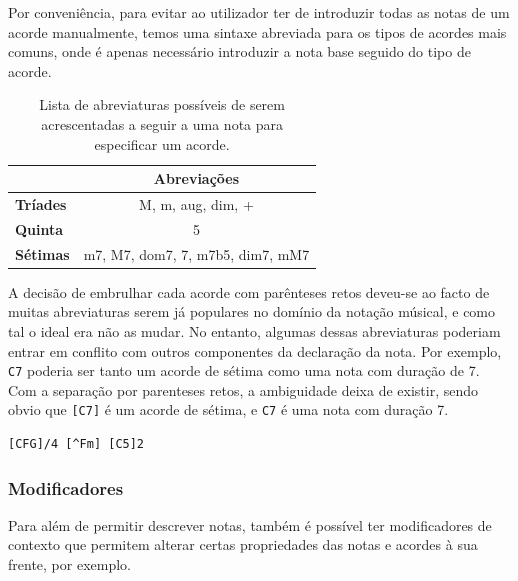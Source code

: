 \documentclass[
  oneside,
  11pt, a4paper,
  footinclude=true,
  headinclude=true,
  cleardoublepage=empty
]{scrbook}
\begin{document}
	Por conveniência, para evitar ao utilizador ter de introduzir todas as notas de um acorde manualmente, temos uma sintaxe abreviada para os tipos de acordes mais comuns, onde é apenas necessário introduzir a nota base seguido do tipo de acorde.
	
\begin{table}[h]
\centering
\def\arraystretch{1.3}
\begin{tabular}{|l|c|}
\hline
\textbf{}        & \textbf{Abreviações}           \\ \hline
\textbf{Tríades} & M, m, aug, dim, +                \\ \hline
\textbf{Quinta}  & 5                                \\ \hline
\textbf{Sétimas} & m7, M7, dom7, 7, m7b5, dim7, mM7 \\ \hline
\end{tabular}
\caption{Lista de abreviaturas possíveis de serem acrescentadas a seguir a uma nota para especificar um acorde.}
\label{tab:modifiers-list}
\end{table}

    A decisão de embrulhar cada acorde com parênteses retos deveu-se ao facto de muitas abreviaturas serem já populares no domínio da notação músical, e como tal o ideal era não as mudar. No entanto, algumas dessas abreviaturas poderiam entrar em conflito com outros componentes da declaração da nota. Por exemplo, \texttt{C7} poderia ser tanto um acorde de sétima como uma nota com duração de 7. Com a separação por parenteses retos, a ambiguidade deixa de existir, sendo obvio que \texttt{[C7]} é um acorde de sétima, e \texttt{C7} é uma nota com duração 7.
    
	\begin{lstlisting}[caption={Exemplos de três definições de acordes possíveis}] 
    [CFG]/4 [^Fm] [C5]2
    \end{lstlisting}
	
	\subsubsection{\textbf{Modificadores}}
	
	Para além de permitir descrever notas, também é possível ter modificadores de contexto que permitem alterar certas propriedades das notas e acordes à sua frente, por exemplo.
	
\end{document}
